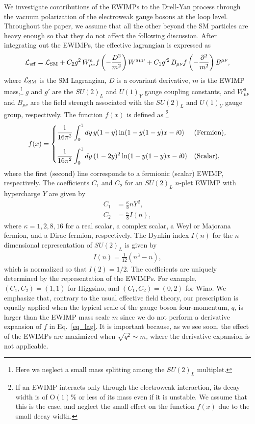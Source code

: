 \documentclass[12pt, a4paper]{article}
\begin{document}
We investigate contributions of the EWIMPs to the Drell-Yan process
through the vacuum polarization of the electroweak gauge bosons at the
loop level. Throughout the paper, we assume that all the other beyond
the SM particles are heavy enough so that they do not affect the
following discussion.  After integrating out the EWIMPs, the effective
lagrangian is expressed as
\begin{align}
 \mathcal{L}_{\rm eff} = \mathcal{L}_{\rm SM} + C_2 g^2\, W_{\mu \nu}^a
 f\left(-\frac{D^2}{m^2}\right) W^{a\mu\nu} + C_1 g'^2\, B_{\mu\nu}
 f\left(-\frac{\partial^2}{m^2}\right) B^{\mu\nu},\label{eq_lag}
\end{align}
where $\mathcal{L}_{\rm SM}$ is the SM Lagrangian, $D$ is a covariant
derivative, $m$ is the EWIMP mass,\footnote{
Here we neglect a small mass splitting among the $SU(2)_L$ multiplet.
} $g$ and $g'$ are the
$SU(2)_L$ and $U(1)_Y$ gauge coupling constants, and $W_{\mu\nu}^a$
and $B_{\mu\nu}$ are the field strength associated with the $SU(2)_L$ and
$U(1)_Y$ gauge group, respectively.  The function $f(x)$ is defined as
\footnote{
  If an EWIMP interacts only through the electroweak interaction, its
  decay width is of $\mathrm{O}(1)\%$ or less of its mass even if it
  is unstable.  We assume that this is the case, and neglect the small
  effect on the function $f(x)$ due to the small decay width.
}
\begin{align}
 f(x) = \begin{cases}
	 \displaystyle{\frac{1}{16\pi^2} \int_0^1 dy\, y(1-y) \ln (1 -
	 y(1-y)x - i0)} & {\rm (Fermion)},\\[5mm]
	 \displaystyle{\frac{1}{16\pi^2} \int_0^1 dy\, (1-2y)^2 \ln (1-
	 y(1-y)x - i0)} & {\rm (Scalar)},
	\end{cases}\label{eq_f}
\end{align}
where the first (second) line corresponds to a fermionic (scalar) EWIMP, respectively.
The coefficients $C_1$ and $C_2$ for an $SU(2)_L$ $n$-plet EWIMP with hypercharge $Y$
are given by
\begin{align}
 C_1 &= \frac{\kappa}{8} n Y^2,\label{eq_C1}\\
 C_2 &= \frac{\kappa}{8} I(n),\label{eq_C2}
\end{align}
where $\kappa = 1, 2, 8, 16$ for a real scalar, a complex scalar, a
Weyl or Majorana fermion, and a Dirac fermion, respectively.  The Dynkin index $I(n)$ for the $n$ dimensional representation of
$SU(2)_L$ is given by
\begin{align}
  I(n) = \frac{1}{12} (n^3 - n),\label{eq_dynkin}
\end{align}
which is normalized so that $I(2) = 1/2$.  The coefficients are
uniquely determined by the representation of the EWIMPs. For example,
$(C_1, C_2) = (1, 1)$ for Higgsino, and $(C_1, C_2) = (0, 2)$ for
Wino.  We emphasize that, contrary to the usual effective field
theory, our prescription is equally applied when the typical scale of
the gauge boson four-momentum, $q$, is larger than the EWIMP mass
scale $m$ since we do not perform a derivative expansion of $f$ in
Eq.~\eqref{eq_lag}.  It is important because, as we see soon, the
effect of the EWIMPs are maximized when $\sqrt{q^2}\sim m$, where the
derivative expansion is not applicable.
\end{document}
